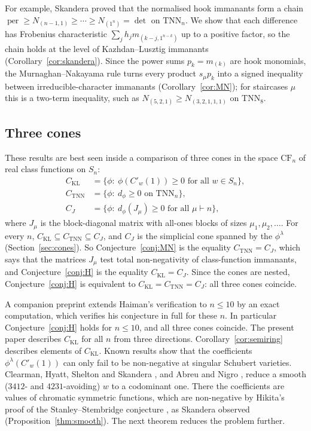 \documentclass[11pt]{amsart}
\theoremstyle{definition}
\theoremstyle{remark}
\newcommand{\TNN}{\mathrm{TNN}}
\newcommand{\per}{\operatorname{per}}
\newcommand{\CF}{\mathrm{CF}}
\newcommand{\CKL}{C_{\mathrm{KL}}}
\newcommand{\CTNN}{C_{\mathrm{TNN}}}
\newcommand{\CJ}{C_{J}}
\newcommand{\Cp}[1]{C'_{#1}(1)}
\begin{document}
For example, Skandera \cite[Thm.~27]{Ska25} proved that the normalised hook immanants form a chain $\per\ge N_{(n-1,1)}\ge\cdots\ge N_{(1^n)}=\det$ on $\TNN_n$. We show that each difference has Frobenius characteristic $\sum_jh_jm_{(k-j,1^{n-k})}$ up to a positive factor, so the chain holds at the level of Kazhdan--Lusztig immanants (Corollary~\ref{cor:skandera}). Since the power sums $p_k=m_{(k)}$ are hook monomials, the Murnaghan--Nakayama rule turns every product $s_\mu p_k$ into a signed inequality between irreducible-character immanants (Corollary~\ref{cor:MN}); for staircases $\mu$ this is a two-term inequality, such as $N_{(5,2,1)}\ge N_{(3,2,1,1,1)}$ on $\TNN_8$.

\subsection*{Three cones}
These results are best seen inside a comparison of three cones in the space $\CF_n$ of real class functions on $S_n$:
\begin{align*}
\CKL&=\{\phi:\ \phi(\Cp w)\ge0\text{ for all }w\in S_n\},\\
\CTNN&=\{\phi:\ d_\phi\ge0\text{ on }\TNN_n\},\\
\CJ&=\{\phi:\ d_\phi(J_\mu)\ge0\text{ for all }\mu\vdash n\},
\end{align*}
where $J_\mu$ is the block-diagonal matrix with all-ones blocks of sizes $\mu_1,\mu_2,\dots$. For every $n$, $\CKL\subseteq\CTNN\subseteq\CJ$, and $\CJ$ is the simplicial cone spanned by the $\phi^\lambda$ (Section~\ref{sec:cones}). So Conjecture~\ref{conj:MN} is the equality $\CTNN=\CJ$, which says that the matrices $J_\mu$ test total non-negativity of class-function immanants, and Conjecture~\ref{conj:H} is the equality $\CKL=\CJ$. Since the cones are nested, Conjecture~\ref{conj:H} is equivalent to $\CKL=\CTNN=\CJ$: all three cones coincide.

A companion preprint \cite{McN} extends Haiman's verification to $n\le10$ by an exact computation, which verifies his conjecture in full for these $n$. In particular Conjecture~\ref{conj:H} holds for $n\le10$, and all three cones coincide. The present paper describes $\CKL$ for all $n$ from three directions. Corollary~\ref{cor:semiring} describes elements of $\CKL$. Known results show that the coefficients $\phi^\lambda(\Cp w)$ can only fail to be non-negative at singular Schubert varieties. Clearman, Hyatt, Shelton and Skandera \cite{CHSS}, and Abreu and Nigro \cite[Thm.~1.6]{AN}, reduce a smooth ($3412$- and $4231$-avoiding) $w$ to a codominant one. There the coefficients are values of chromatic symmetric functions, which are non-negative by Hikita's proof of the Stanley--Stembridge conjecture \cite{Hik}, as Skandera observed \cite[Prop.~25]{Ska25} (Proposition~\ref{thm:smooth}). The next theorem reduces the problem further.
\end{document}

